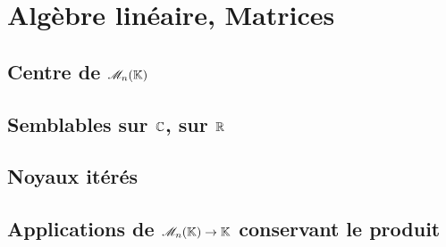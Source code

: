 \chapter{Algèbre linéaire, Matrices}



\newpage

%     

% 

\section{Centre de \texorpdfstring{$\mathscr{M}_n(\mathbb{K})$}{l'espace des matrices carrées}}


\section{Semblables sur \texorpdfstring{$\mathbb{C}$, sur $\mathbb{R}$}{C, sur R}}


\section{Noyaux itérés}


\section{Applications de \texorpdfstring{$\mathscr{M}_n(\mathbb{K}) \to \mathbb{K}$}{l'espace des matrices carrées dans le corps K} conservant le produit}


